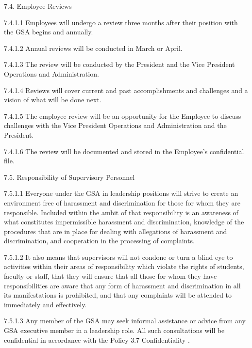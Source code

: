  7.4. Employee Reviews 
 
 7.4.1.1 Employees will undergo a review three months after their position 
 with the GSA begins and annually. 
 
 
 
 7.4.1.2 Annual reviews will be conducted in March or April. 
 
 
 
 7.4.1.3 The review will be conducted by the President and the Vice 
 President Operations and Administration. 
 
 
 
 7.4.1.4 Reviews will cover current and past accomplishments and challenges 
 and a vision of what will be done next. 
 
 
 
 7.4.1.5 The employee review will be an opportunity for the Employee 
 to discuss challenges with the Vice President Operations and 
 Administration and the President. 
 
 
 
 7.4.1.6 The review will be documented and stored in the Employee’s 
 confidential file. 
 
 7.5. Responsibility of Supervisory Personnel 
 
 
 
 7.5.1.1 Everyone under the GSA in leadership positions will strive 
 to create an environment free of harassment and discrimination for 
 those for whom they are responsible. Included within the ambit of that 
 responsibility is an awareness of what constitutes impermissible 
 harassment and discrimination, knowledge of the procedures that are 
 in place for dealing with allegations of harassment and discrimination, 
 and cooperation in the processing of complaints. 
 
 
 
 7.5.1.2 It also means that supervisors will not condone or turn a blind eye 
 to activities within their areas of responsibility which violate the 
 rights of students, faculty or staff, that they will ensure that all those 
 for whom they have responsibilities are aware that any form of 
 harassment and discrimination in all its manifestations is prohibited, 
 and that any complaints will be attended to immediately and 
 effectively. 
 
 
 
 7.5.1.3 Any member of the GSA may seek informal assistance or advice 
 from any GSA executive member in a leadership role. All such 
 consultations will be confidential in accordance with the Policy 3.7 
 Confidentiality . 
 
